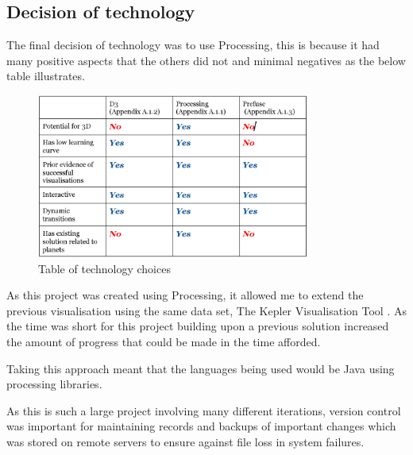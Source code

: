 \subsection{Decision of technology}
The final decision of technology was to use Processing, this is because it had
many positive aspects that the others did not and minimal negatives as the below
table illustrates.
\clearpage
\begin{figure}[H]
  \centering
      \includegraphics[width=0.8\textwidth]{images/table_technologies.jpg}
  \caption{Table of technology choices}
\end{figure}

As this project was created using Processing, it allowed me to extend the
previous visualisation using the same data set, The Kepler Visualisation Tool
\cite{kepler_github, kepler_article}. As the time was short for this project
building upon a previous solution increased the amount of progress that could be
made in the time afforded.

Taking this approach meant that the languages being used would be Java using
processing libraries. 

As this is such a large project involving many different iterations, version
control was important for maintaining records and backups of important changes
which was stored on remote servers to ensure against file loss in system
failures.

